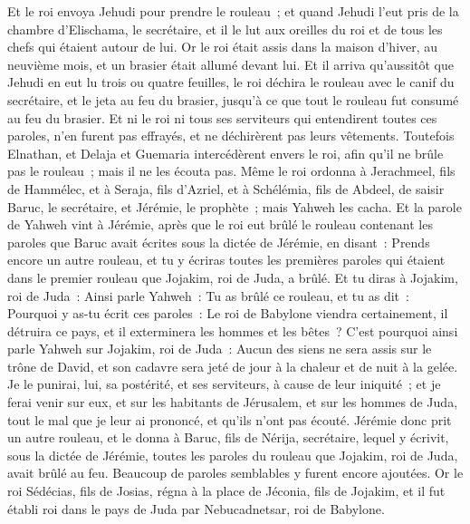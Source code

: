 \begin{multicols}{2}
Et le roi envoya Jehudi pour prendre le rouleau~; et quand Jehudi l'eut pris de la chambre d'Elischama, le secrétaire, et il le lut aux oreilles du roi et de tous les chefs qui étaient autour de lui.
Or le roi était assis dans la maison d'hiver, au neuvième mois, et un brasier était allumé devant lui.
Et il arriva qu'aussitôt que Jehudi en eut lu trois ou quatre feuilles, le roi déchira le rouleau avec le canif du secrétaire, et le jeta au feu du brasier, jusqu'à ce que tout le rouleau fut consumé au feu du brasier.
Et ni le roi ni tous ses serviteurs qui entendirent toutes ces paroles, n'en furent pas effrayés, et ne déchirèrent pas leurs vêtements.
Toutefois Elnathan, et Delaja et Guemaria intercédèrent envers le roi, afin qu'il ne brûle pas le rouleau~; mais il ne les écouta pas.
Même le roi ordonna à Jerachmeel, fils de Hammélec, et à Seraja, fils d'Azriel, et à Schélémia, fils de Abdeel, de saisir Baruc, le secrétaire, et Jérémie, le prophète~; mais Yahweh les cacha.
Et la parole de Yahweh vint à Jérémie, après que le roi eut brûlé le rouleau contenant les paroles que Baruc avait écrites sous la dictée de Jérémie, en disant~:
Prends encore un autre rouleau, et tu y écriras toutes les premières paroles qui étaient dans le premier rouleau que Jojakim, roi de Juda, a brûlé.
Et tu diras à Jojakim, roi de Juda~: Ainsi parle Yahweh~: Tu as brûlé ce rouleau, et tu as dit~: Pourquoi y as-tu écrit ces paroles~: Le roi de Babylone viendra certainement, il détruira ce pays, et il exterminera les hommes et les bêtes~?
C'est pourquoi ainsi parle Yahweh sur Jojakim, roi de Juda~: Aucun des siens ne sera assis sur le trône de David, et son cadavre sera jeté de jour à la chaleur et de nuit à la gelée.
Je le punirai, lui, sa postérité, et ses serviteurs, à cause de leur iniquité~; et je ferai venir sur eux, et sur les habitants de Jérusalem, et sur les hommes de Juda, tout le mal que je leur ai prononcé, et qu'ils n'ont pas écouté.
Jérémie donc prit un autre rouleau, et le donna à Baruc, fils de Nérija, secrétaire, lequel y écrivit, sous la dictée de Jérémie, toutes les paroles du rouleau que Jojakim, roi de Juda, avait brûlé au feu. Beaucoup de paroles semblables y furent encore ajoutées.
\VerseOne{}Or le roi Sédécias, fils de Josias, régna à la place de Jéconia, fils de Jojakim, et il fut établi roi dans le pays de Juda par Nebucadnetsar, roi de Babylone.

\end{multicols}
